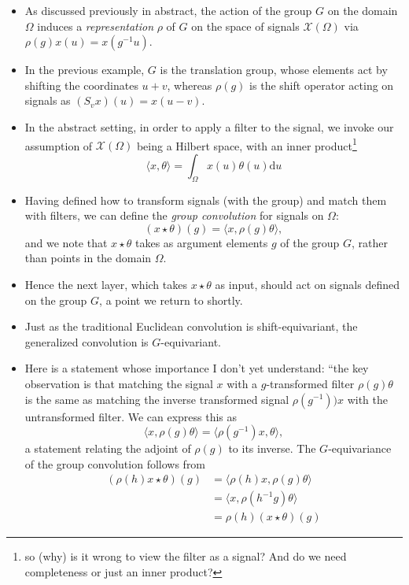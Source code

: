 \documentclass[12pt]{article}
\numberwithin{equation}{section}
\theoremstyle{definition}
\newcommand{		\1		}	{	\bm{1}					}%
\begin{document}
\begin{itemize}
\item As discussed previously in abstract, the action of the group $G$ on the domain $\Omega$ induces a \emph{representation} $\rho$ of $G$ on the space of signals $\mathcal{X}(\Omega)$ via $\rho(g) x(u) = x(g^{-1} u)$.
\item In the previous example, $G$ is the translation group, whose elements act by shifting the coordinates $u+v$, whereas $\rho(g)$ is the shift operator acting on signals as $(S_v x)(u) = x(u - v)$. 
\item In the abstract setting, in order to apply a filter to the signal, we invoke our assumption of $\mathcal{X}(\Omega)$ being a Hilbert space, with an inner product\footnote{so (why) is it wrong to view the filter as a signal? And do we need completeness or just an inner product?} 
$$
\langle x , \theta \rangle = \int_{\Omega} x(u) \theta(u) \textrm{d}u 
$$
\item Having defined how to transform signals (with the group) and match them with filters, we can define the \emph{group convolution} for signals on $\Omega$:
$$
( x \star \theta ) (g) = \langle x, \rho(g) \theta \rangle ,
$$
and we note that $x \star \theta$ takes as argument elements $g$ of the group $G$, rather than points in the domain $\Omega$.\\
\item Hence the next layer, which takes $x \star \theta$ as input, should act on signals defined on the group $G$, a point we return to shortly.
\item Just as the traditional Euclidean convolution is shift-equivariant, the generalized convolution is $G$-equivariant. 
\item Here is a statement whose importance I don't yet understand: ``the key observation is that matching the signal $x$ with a $g$-transformed filter $\rho(g) \theta$ is the same as matching the inverse transformed signal $\rho(g^{-1}) ) x$ with the untransformed filter. We can express this as
$$
\langle x , \rho(g) \theta \rangle = \langle \rho(g^{-1})x, \theta \rangle ,
$$
a statement relating the adjoint of $\rho(g)$ to its inverse. The $G$-equivariance of the group convolution follows from
\begin{align*}
( \rho(h) x \star \theta ) (g) &= \langle \rho(h) x , \rho(g) \theta \rangle \\
&= \langle x , \rho(h^{-1} g) \theta \rangle \\
&= \rho(h) (x \star \theta) (g) 
\end{align*} 
\end{itemize}
\end{document}
